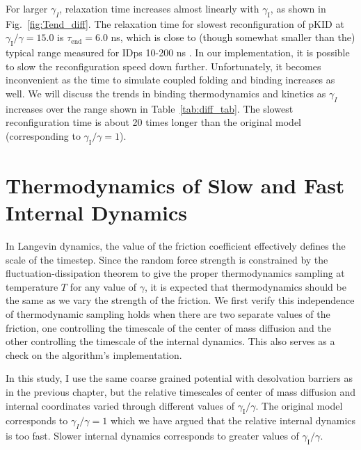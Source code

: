 \documentclass[../talant.diss.submit.tex]{subfiles}
\begin{document}
For larger $\gamma_I$, relaxation time increases almost linearly with $\gamma_{\mathrm{I}}$,
as shown in Fig.~\ref{fig:Tend_diff}.
The relaxation time for slowest reconfiguration of pKID at $\gamma_\mathrm{I}/\gamma=15.0$ is 
$\tau_{\mathrm{end}}=6.0$ ns, which is close to (though somewhat smaller than the)
typical range measured for IDps 10-200 ns .
In our implementation, it is possible to slow the reconfiguration speed down further. Unfortunately,
it becomes inconvenient as the time to simulate coupled folding and binding increases
as well. We will discuss the trends in binding thermodynamics and kinetics as $\gamma_I$ increases
over the range shown in Table~\ref{tab:diff_tab}. The slowest reconfiguration time is about
20 times longer than the original model (corresponding to $\gamma_\mathrm{I}/\gamma = 1$).

%
%
\section{\textbf{Thermodynamics of Slow and Fast Internal Dynamics}}\label{sect:slow_fast_thermo}
%   

In Langevin dynamics, the value of the friction coefficient effectively defines
the scale of the timestep. Since the random force strength is constrained
by the fluctuation-dissipation theorem to give the proper thermodynamics sampling at temperature
$T$ for any value of $\gamma$, it is expected that thermodynamics should be the same as we
vary the strength of the friction. We first verify this independence of thermodynamic
sampling holds when there are two separate values of the friction, one controlling the timescale
of the center of mass diffusion and the other controlling the timescale of the internal dynamics. 
This also serves as a check on the  algorithm's implementation.

In this study, I use the same coarse grained potential with desolvation barriers as in the previous chapter, but the
relative timescales of center of mass diffusion and internal coordinates varied through different
values of $\gamma_\mathrm{I}/\gamma$. The original model corresponds to $\gamma_{I}/\gamma = 1$ which we have argued that
the relative internal dynamics is too fast. Slower internal dynamics corresponds to greater values of
$\gamma_\mathrm{I}/\gamma$. 
\end{document}
